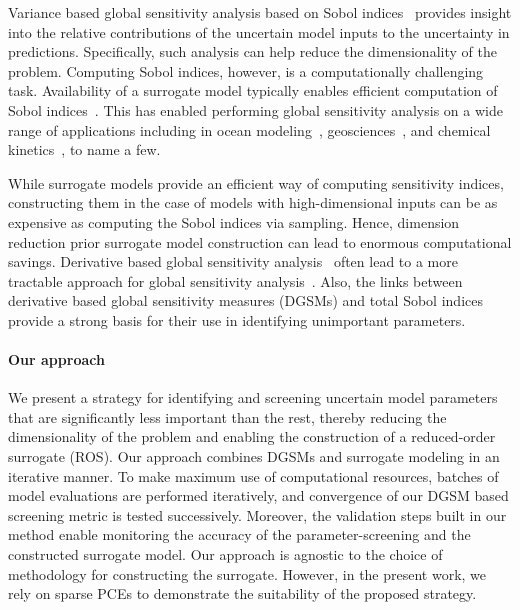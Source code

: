 
Variance based global sensitivity analysis based on Sobol indices~\cite{Sobol93,
Sobol:2001,
Owen13,
SaltelliRattoAndresEtAl08} provides
insight into the relative contributions of the uncertain model inputs to the
uncertainty in predictions. Specifically, such analysis can help reduce the
dimensionality of the problem.  Computing Sobol indices, however, is a
computationally challenging task.  
Availability of a surrogate model typically
enables efficient computation 
of Sobol indices~\cite{Sudret08,CrestauxLeMaitreMartinez09,BlatmanSudret10,HartAlexanderianGremaud17,Sargsyan17}. This has enabled performing global sensitivity analysis
on a wide range of applications including in ocean 
modeling~\cite{AlexanderianWinokurSrajEtAl12,LiIskandaraniLeHenaffEtAl16},
geosciences~\cite{Namhata2016OladyshkinDilmoreEtAl16,deman2016,SaadAlexanderianPrudhommeEtAl17},
and chemical kinetics~\cite{DegasperiGilmore08,navarro2016global}, to name a few.

While surrogate models provide an efficient way of computing sensitivity
indices, constructing them in the case of models with high-dimensional inputs
can be as expensive as computing the Sobol indices via sampling.  Hence,
dimension reduction prior surrogate model construction can lead to enormous
computational savings.  Derivative based global sensitivity
analysis~\cite{Sobol:2009,Sobol:2010,Lamboni:2013,Kucherenko:2009,Kucherenko:2016}
often lead to a more tractable approach for global sensitivity
analysis~\cite{Kucherenko:2016}.  Also, the links between derivative based
global sensitivity measures (DGSMs) and total Sobol
indices~\cite{Sobol:2009,Kucherenko:2009,Kucherenko:2016} provide a strong
basis for their use in identifying unimportant parameters. 




\paragraph{Our approach}
We present a strategy for identifying and screening uncertain model parameters
that are significantly less important than the rest, thereby reducing the
dimensionality of the problem and enabling the construction of a reduced-order
surrogate (ROS).  Our approach combines DGSMs and surrogate modeling in an
iterative manner.  To make maximum use of computational resources, batches of
model evaluations are performed iteratively, and convergence of our DGSM based
screening metric is tested successively. Moreover, the validation steps built
in our method enable monitoring the accuracy of the parameter-screening and the
constructed surrogate model.  Our approach is agnostic to the choice of
methodology for constructing the surrogate. However, in the present work, we
rely on sparse PCEs to demonstrate the suitability of the proposed strategy.  

